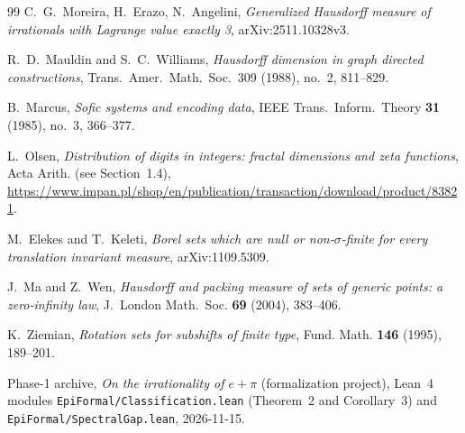 \documentclass[11pt]{article}
\theoremstyle{definition}
\theoremstyle{remark}
\begin{document}
\begin{thebibliography}{99}
 C.~G.~Moreira, H.~Erazo, N.~Angelini,
\emph{Generalized Hausdorff measure of irrationals with Lagrange value exactly 3},
arXiv:2511.10328v3.

{\sloppy
{} R.~D.~Mauldin and S.~C.~Williams,
\emph{Hausdorff dimension in graph directed constructions},
Trans.~Amer.~Math.~Soc.~309 (1988), no.~2, 811--829.
}

 B.~Marcus, \emph{Sofic systems and encoding data},
IEEE Trans.~Inform.~Theory \textbf{31} (1985), no.~3, 366--377.

 L.~Olsen,
\emph{Distribution of digits in integers: fractal dimensions and zeta functions},
Acta Arith. (see Section~1.4),
\url{https://www.impan.pl/shop/en/publication/transaction/download/product/83821}.

 M.~Elekes and T.~Keleti,
\emph{Borel sets which are null or non-$\sigma$-finite for every
translation invariant measure}, arXiv:1109.5309.


J.~Ma and Z.~Wen, \emph{Hausdorff and packing measure of sets of
generic points: a zero-infinity law}, J.~London Math.~Soc.
\textbf{69} (2004), 383--406.

K.~Ziemian, \emph{Rotation sets for subshifts of finite type},
Fund. Math. \textbf{146} (1995), 189--201.

 Phase-1 archive, \emph{On the irrationality of $e+\pi$}
(formalization project), Lean~4 modules \texttt{EpiFormal/\allowbreak Classification.lean}
(Theorem~2 and Corollary~3) and \texttt{EpiFormal/\allowbreak Spectral\allowbreak Gap.lean}, 2026-11-15.
\end{thebibliography}
\end{document}

